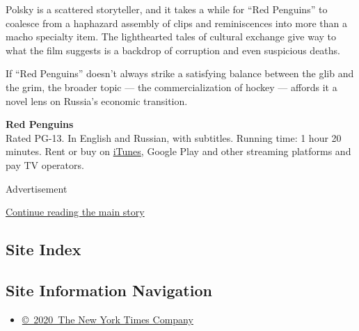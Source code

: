Polsky is a scattered storyteller, and it takes a while for ``Red
Penguins'' to coalesce from a haphazard assembly of clips and
reminiscences into more than a macho specialty item. The lighthearted
tales of cultural exchange give way to what the film suggests is a
backdrop of corruption and even suspicious deaths.

If ``Red Penguins'' doesn't always strike a satisfying balance between
the glib and the grim, the broader topic --- the commercialization of
hockey --- affords it a novel lens on Russia's economic transition.

\textbf{Red Penguins}\\
Rated PG-13. In English and Russian, with subtitles. Running time: 1
hour 20 minutes. Rent or buy on
\href{https://tv.apple.com/us/movie/red-penguins/umc.cmc.1a55rxdxlme2cwu9ylp4edln7}{iTunes},
Google Play and other streaming platforms and pay TV operators.

Advertisement

\protect\hyperlink{after-bottom}{Continue reading the main story}

\hypertarget{site-index}{%
\subsection{Site Index}\label{site-index}}

\hypertarget{site-information-navigation}{%
\subsection{Site Information
Navigation}\label{site-information-navigation}}

\begin{itemize}
\tightlist
\item
  \href{https://help.nytimes3xbfgragh.onion/hc/en-us/articles/115014792127-Copyright-notice}{©~2020~The
  New York Times Company}
\end{itemize}

